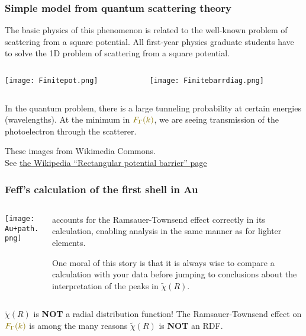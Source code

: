 \documentclass[10pt, xcolor=x11names, compress]{beamer}
\begin{document}
\begin{frame}
  \frametitle{Simple model from quantum scattering theory}
  The basic physics of this phenomenon is related to the well-known
  problem of scattering from a square potential.  All first-year
  physics graduate students have to solve the 1D problem of scattering
  from a square potential.
  \begin{columns}[T]
    \begin{column}{0.6\linewidth}
      \centering\texttt{[image: Finitepot.png]}
    \end{column}
    \begin{column}{0.4\linewidth}
      \texttt{[image: Finitebarrdiag.png]}      
    \end{column}
  \end{columns}
  In the quantum problem, there is a large tunneling probability at
  certain energies (wavelengths).  At the minimum in
  ${\color{Gold4}F_\Gamma(k)}$, we are seeing transmission of the
  photoelectron through the scatterer.
  \begin{bottomnote}[0.7][19.5]%
    These images from Wikimedia Commons.\\See
    \href{http://en.wikipedia.org/wiki/Rectangular_potential_barrier}
    {\color{LightBlue2}the Wikipedia ``Rectangular potential barrier'' page}
  \end{bottomnote}
\end{frame}

\begin{frame}
  \frametitle{Feff's calculation of the first shell in Au}
  \begin{columns}
    \begin{column}{0.5\linewidth}
      \texttt{[image: Au+path.png]}
    \end{column}
    \begin{column}{0.5\linewidth}
      {\feff} accounts for the Ramsauer-Townsend effect correctly in
      its calculation, enabling analysis in the same manner as for
      lighter elements.

      \bigskip

      One moral of this story is that it is always wise to compare a
      {\feff} calculation with your data before jumping to conclusions
      about the interpretation of the peaks in $\tilde\chi(R)$.
    \end{column}
  \end{columns}

  \bigskip

  \begin{alertblock}{$\tilde\chi(R)$ is \textbf{NOT} a radial distribution function!}
    The Ramsauer-Townsend effect on ${\color{Gold4}F_\Gamma(k)}$ is
    among the many reasons $\tilde\chi(R)$ is \textbf{NOT} an RDF.
  \end{alertblock}
\end{frame}
\end{document}
